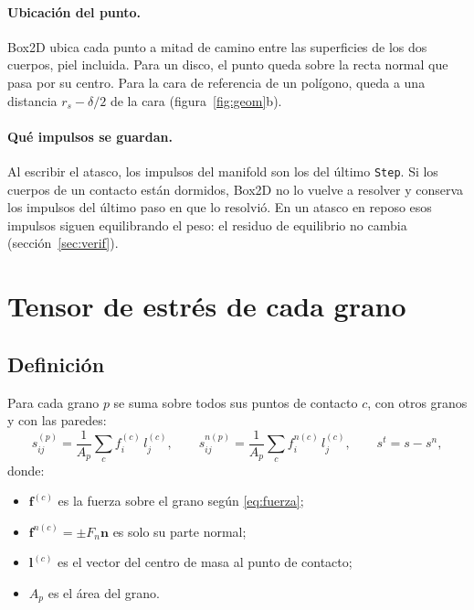 \documentclass[11pt,a4paper]{article}
\newcommand{\vect}[1]{\mathbf{#1}}
\newcommand{\n}{\vect{n}}
\newcommand{\lv}{\vect{l}}
\newcommand{\f}{\vect{f}}
\newcommand{\codeus}{\textunderscore\allowbreak}
\newcommand{\code}[1]{\texttt{\begingroup\let\_\codeus#1\endgroup}}
\begin{document}
\paragraph{Ubicación del punto.} Box2D ubica cada punto a mitad de camino
entre las superficies de los dos cuerpos, piel incluida. Para un disco,
el punto queda sobre la recta normal que pasa por su centro. Para la cara
de referencia de un polígono, queda a una distancia $r_s - \delta/2$ de
la cara (figura~\ref{fig:geom}b).

\paragraph{Qué impulsos se guardan.} Al escribir el atasco, los impulsos
del manifold son los del último \code{Step}. Si los cuerpos de un contacto
están dormidos, Box2D no lo vuelve a resolver y conserva los impulsos del
último paso en que lo resolvió. En un atasco en reposo esos impulsos
siguen equilibrando el peso: el residuo de equilibrio no cambia
(sección~\ref{sec:verif}).

\section{Tensor de estrés de cada grano}
\label{sec:tensor}

\subsection{Definición}

Para cada grano $p$ se suma sobre todos sus puntos de contacto $c$, con
otros granos y con las paredes:
\begin{equation}
  s^{(p)}_{ij} = \frac{1}{A_p}\sum_c f^{(c)}_i\, l^{(c)}_j, \qquad
  s^{n(p)}_{ij} = \frac{1}{A_p}\sum_c f^{n(c)}_i\, l^{(c)}_j, \qquad
  s^t = s - s^n,
  \label{eq:love}
\end{equation}
donde:
\begin{itemize}
  \item $\f^{(c)}$ es la fuerza sobre el grano según \eqref{eq:fuerza};
  \item $\f^{n(c)} = \pm F_n\n$ es solo su parte normal;
  \item $\lv^{(c)}$ es el vector del centro de masa al punto de contacto;
  \item $A_p$ es el área del grano.
\end{itemize}
\end{document}
